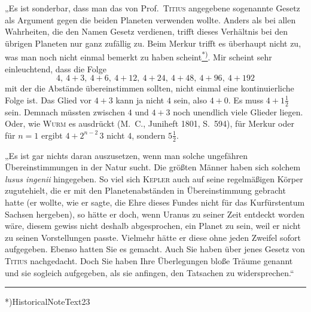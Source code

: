 „Es ist sonderbar, dass man das von Prof.\ \textsc{Titius} angegebene sogenannte Gesetz als Argument gegen die beiden Planeten verwenden wollte. Anders als bei allen Wahrheiten, die den Namen Gesetz verdienen, trifft dieses Verhältnis bei den übrigen Planeten nur ganz zufällig zu. Beim Merkur trifft es überhaupt nicht zu, was man noch nicht einmal bemerkt zu haben scheint\hyperlink{native-236-note}{\textsuperscript{*)}}. Mir scheint sehr einleuchtend, dass die Folge
\[
4,\ 4+3,\ 4+6,\ 4+12,\ 4+24,\ 4+48,\ 4+96,\ 4+192
\]
mit der die Abstände übereinstimmen sollten, nicht einmal eine kontinuierliche Folge ist. Das Glied vor $4+3$ kann ja nicht $4$ sein, also $4+0$. Es muss $4+1\frac12$ sein. Demnach müssten zwischen $4$ und $4+3$ noch unendlich viele Glieder liegen. Oder, wie \textsc{Wurm} es ausdrückt (M.\ C., Juniheft 1801, S.\ 594), für Merkur oder für $n=1$ ergibt $4+2^{n-2}\,3$ nicht $4$, sondern $5\frac12$.

„Es ist gar nichts daran auszusetzen, wenn man solche ungefähren Übereinstimmungen in der Natur sucht. Die größten Männer haben sich solchem \textit{lusus ingenii} hingegeben. So viel sich \textsc{Kepler} auch auf seine regelmäßigen Körper zugutehielt, die er mit den Planetenabständen in Übereinstimmung gebracht hatte (er wollte, wie er sagte, die Ehre dieses Fundes nicht für das Kurfürstentum Sachsen hergeben), so hätte er doch, wenn Uranus zu seiner Zeit entdeckt worden wäre, diesem gewiss nicht deshalb abgesprochen, ein Planet zu sein, weil er nicht zu seinen Vorstellungen passte. Vielmehr hätte er diese ohne jeden Zweifel sofort aufgegeben. Ebenso hatten Sie es gemacht. Auch Sie haben über jenes Gesetz von \textsc{Titius} nachgedacht. Doch Sie haben Ihre Überlegungen bloße Träume genannt und sie sogleich aufgegeben, als sie anfingen, den Tatsachen zu widersprechen.“
\par\nobreak\smallskip
\noindent\rule{.24\linewidth}{.3pt}\par\nobreak\smallskip
{\footnotesize\indent\hypertarget{native-236-note}{}*)\enspace\csname HistoricalNoteText23\endcsname\par}
\begin{flushright}\end{flushright}

